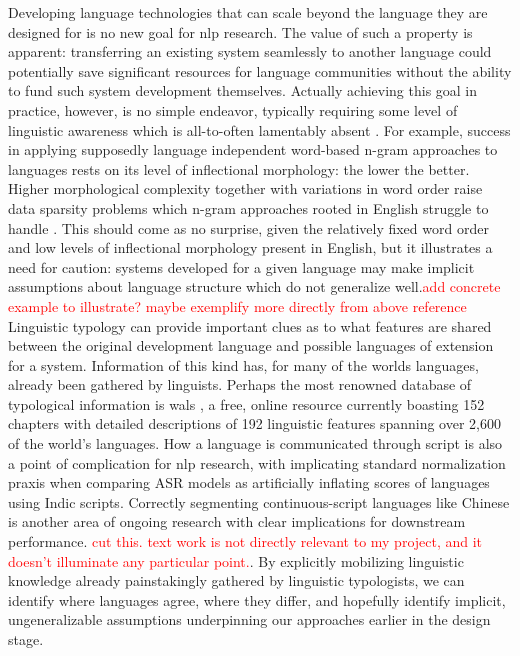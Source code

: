 \documentclass[thesis]{cluu}
\newcommand{\todo}[1]{\textcolor{red}{#1}}
\begin{document}
Developing language technologies that can scale beyond the language they are designed for is no new goal for \gls{nlp} research. The value of such a property is apparent: transferring an existing system seamlessly to another language could potentially save significant resources for language communities without the ability to fund such system development themselves. Actually achieving this goal in practice, however, is no simple endeavor, typically requiring some level of linguistic awareness which is all-to-often lamentably absent \parencite[see][inter alia]{benderAchievingEvaluatingLanguageIndependence2011,joshiStateFateLinguistic2021,hedderichSurveyRecentApproaches2021}. For example, success in applying supposedly language independent word-based n-gram approaches to languages rests on its level of inflectional morphology: the lower the better. Higher morphological complexity together with variations in word order raise data sparsity problems which n-gram approaches rooted in English struggle to handle \parencite{benderAchievingEvaluatingLanguageIndependence2011}. This should come as no surprise, given the relatively fixed word order and low levels of inflectional morphology present in English, but it illustrates a need for caution: systems developed for a given language may make implicit assumptions about language structure which do not generalize well.\todo{add concrete example to illustrate? maybe exemplify more directly from above reference} Linguistic typology can provide important clues as to what features are shared between the original development language and possible languages of extension for a system. Information of this kind has, for many of the worlds languages, already been gathered by linguists. Perhaps the most renowned database of typological information is \gls{wals} \parencite{matthewdryerWorldAtlasLanguage2024}, a free, online resource currently boasting 152 chapters with detailed descriptions of 192 linguistic features spanning over 2,600 of the world's languages. How a language is communicated through script is also a point of complication for \gls{nlp} research, with \textcite{manoharWhatLostNormalization2024} implicating standard normalization praxis when comparing ASR models as artificially inflating scores of languages using Indic scripts. Correctly segmenting continuous-script languages like Chinese is another area of ongoing research with clear implications for downstream performance. \todo{cut this. text work is not directly relevant to my project, and it doesn't illuminate any particular point.}. By explicitly mobilizing linguistic knowledge already painstakingly gathered by linguistic typologists, we can identify where languages agree, where they differ, and hopefully identify implicit, ungeneralizable assumptions underpinning our approaches earlier in the design stage.
\end{document}
